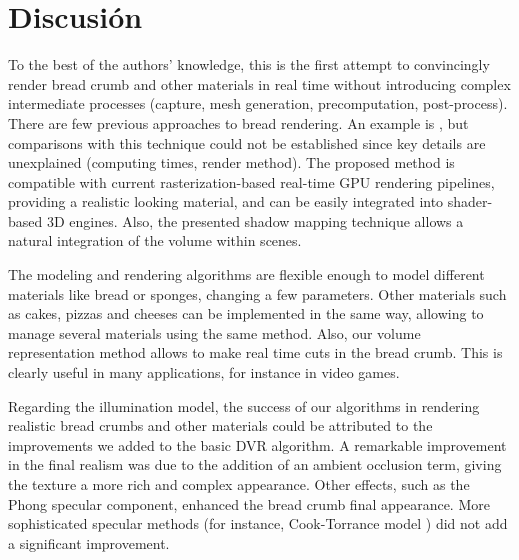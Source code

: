 
\section{Discusión}


To the best of the authors' knowledge, this is the first attempt to convincingly render bread crumb and other materials in real time without introducing complex intermediate processes (capture, mesh generation, precomputation, post-process).
There are few previous approaches to bread rendering. An example is \cite{Cho2007}, but comparisons with this technique could not be established since key details are unexplained (computing times, render method).
The proposed method is compatible with current rasterization-based real-time GPU rendering pipelines, providing a realistic looking material, and can be easily integrated into  shader-based 3D engines.
Also, the presented shadow mapping technique allows a natural integration of the volume within scenes. 


The modeling and rendering algorithms are flexible enough to model different materials like bread or sponges, changing a few parameters.
Other materials such as cakes, pizzas and cheeses can be implemented in the same way, allowing to manage several materials using the same method.
Also, our volume representation method allows to make real time cuts in the bread crumb.
This is clearly useful in many applications, for instance in video games.

Regarding the illumination model, the success of our algorithms in rendering realistic bread crumbs and other materials could be attributed to the improvements we added to the basic DVR algorithm.
A remarkable improvement in the final realism was due to the addition of an ambient occlusion term, giving the texture a more rich and complex appearance.
Other effects, such as the Phong specular component, enhanced the bread crumb final appearance.
More sophisticated specular methods (for instance, Cook-Torrance model \cite{Cook1982}) did not add a significant improvement.

